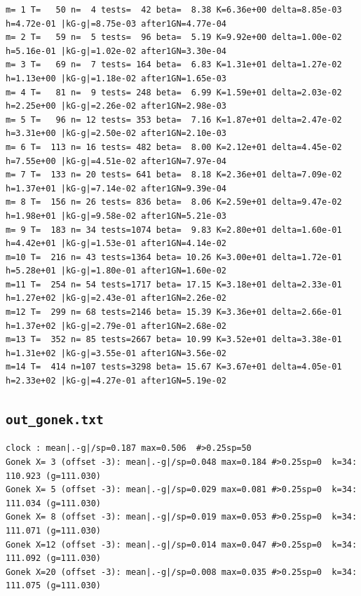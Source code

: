 \documentclass[11pt,reqno]{amsart}
\numberwithin{equation}{section}
\theoremstyle{plain}
\theoremstyle{definition}
\theoremstyle{remark}
\begin{document}
\begin{lstlisting}[style=out]
m= 1 T=   50 n=  4 tests=  42 beta=  8.38 K=6.36e+00 delta=8.85e-03 h=4.72e-01 |kG-g|=8.75e-03 after1GN=4.77e-04
m= 2 T=   59 n=  5 tests=  96 beta=  5.19 K=9.92e+00 delta=1.00e-02 h=5.16e-01 |kG-g|=1.02e-02 after1GN=3.30e-04
m= 3 T=   69 n=  7 tests= 164 beta=  6.83 K=1.31e+01 delta=1.27e-02 h=1.13e+00 |kG-g|=1.18e-02 after1GN=1.65e-03
m= 4 T=   81 n=  9 tests= 248 beta=  6.99 K=1.59e+01 delta=2.03e-02 h=2.25e+00 |kG-g|=2.26e-02 after1GN=2.98e-03
m= 5 T=   96 n= 12 tests= 353 beta=  7.16 K=1.87e+01 delta=2.47e-02 h=3.31e+00 |kG-g|=2.50e-02 after1GN=2.10e-03
m= 6 T=  113 n= 16 tests= 482 beta=  8.00 K=2.12e+01 delta=4.45e-02 h=7.55e+00 |kG-g|=4.51e-02 after1GN=7.97e-04
m= 7 T=  133 n= 20 tests= 641 beta=  8.18 K=2.36e+01 delta=7.09e-02 h=1.37e+01 |kG-g|=7.14e-02 after1GN=9.39e-04
m= 8 T=  156 n= 26 tests= 836 beta=  8.06 K=2.59e+01 delta=9.47e-02 h=1.98e+01 |kG-g|=9.58e-02 after1GN=5.21e-03
m= 9 T=  183 n= 34 tests=1074 beta=  9.83 K=2.80e+01 delta=1.60e-01 h=4.42e+01 |kG-g|=1.53e-01 after1GN=4.14e-02
m=10 T=  216 n= 43 tests=1364 beta= 10.26 K=3.00e+01 delta=1.72e-01 h=5.28e+01 |kG-g|=1.80e-01 after1GN=1.60e-02
m=11 T=  254 n= 54 tests=1717 beta= 17.15 K=3.18e+01 delta=2.33e-01 h=1.27e+02 |kG-g|=2.43e-01 after1GN=2.26e-02
m=12 T=  299 n= 68 tests=2146 beta= 15.39 K=3.36e+01 delta=2.66e-01 h=1.37e+02 |kG-g|=2.79e-01 after1GN=2.68e-02
m=13 T=  352 n= 85 tests=2667 beta= 10.99 K=3.52e+01 delta=3.38e-01 h=1.31e+02 |kG-g|=3.55e-01 after1GN=3.56e-02
m=14 T=  414 n=107 tests=3298 beta= 15.67 K=3.67e+01 delta=4.05e-01 h=2.33e+02 |kG-g|=4.27e-01 after1GN=5.19e-02
\end{lstlisting}

\subsection{\texttt{out\_gonek.txt}}
\label{app:out-routeB-gonek}

\begin{lstlisting}[style=out]
clock : mean|.-g|/sp=0.187 max=0.506  #>0.25sp=50
Gonek X= 3 (offset -3): mean|.-g|/sp=0.048 max=0.184 #>0.25sp=0  k=34: 110.923 (g=111.030)
Gonek X= 5 (offset -3): mean|.-g|/sp=0.029 max=0.081 #>0.25sp=0  k=34: 111.034 (g=111.030)
Gonek X= 8 (offset -3): mean|.-g|/sp=0.019 max=0.053 #>0.25sp=0  k=34: 111.071 (g=111.030)
Gonek X=12 (offset -3): mean|.-g|/sp=0.014 max=0.047 #>0.25sp=0  k=34: 111.092 (g=111.030)
Gonek X=20 (offset -3): mean|.-g|/sp=0.008 max=0.035 #>0.25sp=0  k=34: 111.075 (g=111.030)
\end{lstlisting}
\end{document}

